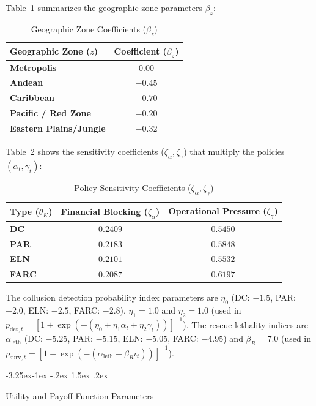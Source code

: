 \documentclass[12pt]{article}
\makeatletter
\numberwithin{equation}{section}
\numberwithin{table}{section}
\renewcommand\subsection{\@startsection{subsection}{2}{\z@}%
                                     {-3.25ex\@plus -1ex \@minus -.2ex}%
                                     {1.5ex \@plus .2ex}%
                                     {\normalfont\large\bfseries\raggedright}}
\makeatother
\begin{document}
Table~\ref{tab:geographic-betas} summarizes the geographic zone parameters $\beta_z$:
\begin{table}[h!]
\centering
\caption{Geographic Zone Coefficients ($\beta_z$)}
\label{tab:geographic-betas}
\begin{tabular}{lc}
\toprule
\textbf{Geographic Zone ($z$)} & \textbf{Coefficient ($\beta_z$)} \\
\midrule
\textbf{Metropolis} & $0.00$ \\
\textbf{Andean} & $-0.45$ \\
\textbf{Caribbean} & $-0.70$ \\
\textbf{Pacific / Red Zone} & $-0.20$ \\
\textbf{Eastern Plains/Jungle} & $-0.32$ \\
\bottomrule
\end{tabular}
\end{table}

Table~\ref{tab:policy-zetas} shows the sensitivity coefficients ($\zeta_{\alpha}, \zeta_{\gamma}$) that multiply the policies $(\alpha_t, \gamma_t)$:
\begin{table}[h!]
\centering
\caption{Policy Sensitivity Coefficients ($\zeta_{\alpha}, \zeta_{\gamma}$)}
\label{tab:policy-zetas}
\begin{tabular}{lcc}
\toprule
\textbf{Type ($\theta_K$)} & \textbf{Financial Blocking ($\zeta_{\alpha}$)} & \textbf{Operational Pressure ($\zeta_{\gamma}$)} \\
\midrule
\textbf{DC} & $0.2409$ & $0.5450$ \\
\textbf{PAR} & $0.2183$ & $0.5848$ \\
\textbf{ELN} & $0.2101$ & $0.5532$ \\
\textbf{FARC} & $0.2087$ & $0.6197$ \\
\bottomrule
\end{tabular}
\end{table}

The collusion detection probability index parameters are $\eta_0$ (DC: $-1.5$, PAR: $-2.0$, ELN: $-2.5$, FARC: $-2.8$), $\eta_1 = 1.0$ and $\eta_2 = 1.0$ (used in $p_{\text{det},t} = [1 + \exp(-(\eta_0 + \eta_1 \alpha_t + \eta_2 \gamma_t))]^{-1}$). The rescue lethality indices are $\alpha_{\text{leth}}$ (DC: $-5.25$, PAR: $-5.15$, ELN: $-5.05$, FARC: $-4.95$) and $\beta_R = 7.0$ (used in $p_{\text{surv},t} = [1 + \exp(-(\alpha_{\text{leth}} + \beta_R \iota_t))]^{-1}$).

\subsection{Utility and Payoff Function Parameters}
\end{document}
